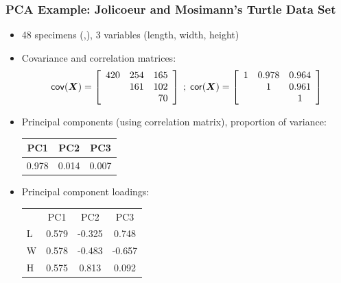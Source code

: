 \documentclass{beamer}
\begin{document}
\begin{frame}
  \frametitle{PCA Example: Jolicoeur and Mosimann's Turtle Data Set}

\begin{itemize}
\item 48 specimens (\Male,\Female), 3 variables (length, width, height)

\item Covariance and correlation matrices:
\footnotesize{
\[
\mathsf{cov}(\bm{X}) = \left[ \begin{array}{rrr}
420 & 254 & 165 \\
       & 161 & 102 \\
       &        &   70\\
\end{array}
\right]
\;
;
\;
\mathsf{cor}(\bm{X}) = \left[ \begin{array}{ccc}
1 & 0.978 & 0.964 \\
       & 1 & 0.961\\
       &        &   1\\
\end{array}
\right]
\]
} %

\item Principal components (using correlation matrix), proportion of variance:

{\small
\begin{center}
\begin{tabular}{ccc}
PC1 & PC2 & PC3 \\ \hline
0.978 & 0.014 & 0.007
\end{tabular}
\end{center}
} %

\item Principal component loadings:

{\small
\begin{center}
\begin{tabular}{lccc}
&PC1 & PC2 & PC3 \\ \cline{2-4}
L & 0.579 & -0.325 & 0.748 \\
W & 0.578 & -0.483 & -0.657 \\
H & 0.575 & 0.813 &  0.092 \\
\end{tabular}
\end{center}
} %



\end{itemize}


\end{frame}
\end{document}
